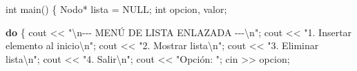 \documentclass[
  11pt,
  a4paper,
  DIV=11,
  numbers=noendperiod]{scrreprt}
\newenvironment{Shaded}{\begin{snugshade}}{\end{snugshade}}
\newcommand{\ControlFlowTok}[1]{\textcolor[rgb]{0.00,0.23,0.31}{\textbf{#1}}}
\newcommand{\DataTypeTok}[1]{\textcolor[rgb]{0.68,0.00,0.00}{#1}}
\newcommand{\NormalTok}[1]{\textcolor[rgb]{0.00,0.23,0.31}{#1}}
\newcommand{\OperatorTok}[1]{\textcolor[rgb]{0.37,0.37,0.37}{#1}}
\newcommand{\SpecialCharTok}[1]{\textcolor[rgb]{0.37,0.37,0.37}{#1}}
\newcommand{\StringTok}[1]{\textcolor[rgb]{0.13,0.47,0.30}{#1}}
\begin{document}
\begin{Shaded}
\begin{Highlighting}[]
\DataTypeTok{int}\NormalTok{ main}\OperatorTok{()} \OperatorTok{\{}
\NormalTok{    Nodo}\OperatorTok{*}\NormalTok{ lista }\OperatorTok{=}\NormalTok{ NULL}\OperatorTok{;}
    \DataTypeTok{int}\NormalTok{ opcion}\OperatorTok{,}\NormalTok{ valor}\OperatorTok{;}

    \ControlFlowTok{do} \OperatorTok{\{}
\NormalTok{        cout }\OperatorTok{\textless{}\textless{}} \StringTok{"}\SpecialCharTok{\textbackslash{}n}\StringTok{{-}{-}{-} MENÚ DE LISTA ENLAZADA {-}{-}{-}}\SpecialCharTok{\textbackslash{}n}\StringTok{"}\OperatorTok{;}
\NormalTok{        cout }\OperatorTok{\textless{}\textless{}} \StringTok{"1. Insertar elemento al inicio}\SpecialCharTok{\textbackslash{}n}\StringTok{"}\OperatorTok{;}
\NormalTok{        cout }\OperatorTok{\textless{}\textless{}} \StringTok{"2. Mostrar lista}\SpecialCharTok{\textbackslash{}n}\StringTok{"}\OperatorTok{;}
\NormalTok{        cout }\OperatorTok{\textless{}\textless{}} \StringTok{"3. Eliminar lista}\SpecialCharTok{\textbackslash{}n}\StringTok{"}\OperatorTok{;}
\NormalTok{        cout }\OperatorTok{\textless{}\textless{}} \StringTok{"4. Salir}\SpecialCharTok{\textbackslash{}n}\StringTok{"}\OperatorTok{;}
\NormalTok{        cout }\OperatorTok{\textless{}\textless{}} \StringTok{"Opción: "}\OperatorTok{;}
\NormalTok{        cin }\OperatorTok{\textgreater{}\textgreater{}}\NormalTok{ opcion}\OperatorTok{;}


\end{Highlighting}
\end{Shaded}
\end{document}
